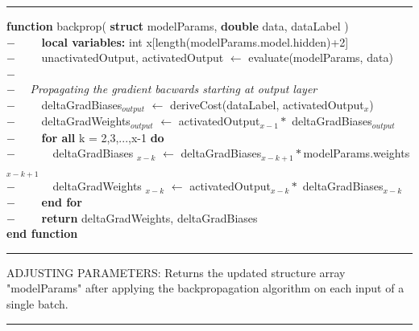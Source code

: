 \rule{\textwidth}{0.4pt}
\begin{addmargin}[2em]{0em}
\textbf{function} backprop( \textbf{struct} modelParams, \textbf{double} data, dataLabel )\\
    $- \qquad$ \textbf{local variables:} int x[length(modelParams.model.hidden)+2]\\
    $- \qquad$ unactivatedOutput, activatedOutput $\leftarrow$ evaluate(modelParams, data)\\
    $- \qquad $\\
    $- \quad $ \textit{Propagating the gradient bacwards starting at output layer}\\
    $- \qquad$ deltaGradBiases$_{output}$ $\leftarrow$ deriveCost(dataLabel, activatedOutput${_x}$)\\
    $- \qquad$ deltaGradWeights$_{output}$ $\leftarrow$ activatedOutput$_{x-1}*$ deltaGradBiases$_{output}$\\
    $- \qquad $ \textbf{for all} k = 2,3,...,x-1 \textbf{do}\\
    $- \qquad \quad $ deltaGradBiases $_{x-k}$ 
    $\leftarrow$ deltaGradBiases$_{x-k+1}*$modelParams.weights$_{x-k+1}$\\
    $- \qquad \quad $ deltaGradWeights $_{x-k}$ 
    $\leftarrow$ activatedOutput$_{x-k}*$ deltaGradBiases$_{x-k}$\\
    $- \qquad $ \textbf{end for}\\
    $- \qquad$ \textbf{return} deltaGradWeights, deltaGradBiases\\
\textbf{end function}\\
\end{addmargin}
\rule{\textwidth}{0.4pt}
 ADJUSTING PARAMETERS: Returns the updated structure array "modelParams" after applying the backpropagation algorithm on each input of a single batch.\\
\rule{\textwidth}{0.4pt}
